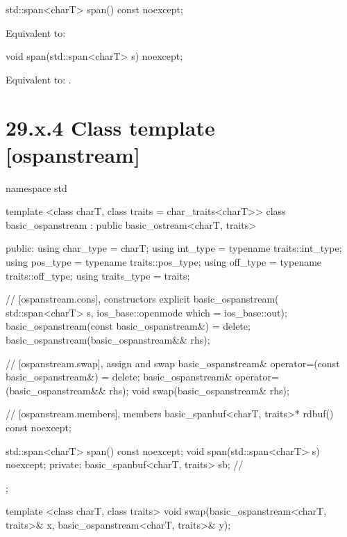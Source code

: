 \documentclass[ebook,11pt,article]{memoir}
\renewcommand{\iref}[1]{[#1]}
\begin{document}
\begin{itemdecl}
std::span<charT> span() const noexcept;
\end{itemdecl}

\begin{itemdescr}
\pnum
\effects Equivalent to:\\
\end{itemdescr}

\begin{itemdecl}
void span(std::span<charT> s) noexcept;
\end{itemdecl}

\begin{itemdescr}
\pnum
\effects
Equivalent to:
.
\end{itemdescr}

\section{29.x.4 Class template  [ospanstream] }

\begin{codeblock}
namespace std {
  template <class charT, class traits = char_traits<charT>>
  class basic_ospanstream
    : public basic_ostream<charT, traits> {
  public:
    using char_type      = charT;
    using int_type       = typename traits::int_type;
    using pos_type       = typename traits::pos_type;
    using off_type       = typename traits::off_type;
    using traits_type    = traits;

    // \iref{ospanstream.cons}, constructors
    explicit basic_ospanstream(
      std::span<charT> s,
      ios_base::openmode which = ios_base::out);
    basic_ospanstream(const basic_ospanstream&) = delete;
    basic_ospanstream(basic_ospanstream&& rhs);

    // \iref{ospanstream.swap}, assign and swap
    basic_ospanstream& operator=(const basic_ospanstream&) = delete;
    basic_ospanstream& operator=(basic_ospanstream&& rhs);
    void swap(basic_ospanstream& rhs);

    // \iref{ospanstream.members}, members
    basic_spanbuf<charT, traits>* rdbuf() const noexcept;

    std::span<charT> span() const noexcept;
    void span(std::span<charT> s) noexcept;
  private:
    basic_spanbuf<charT, traits> sb; // \expos
  };

  template <class charT, class traits>
    void swap(basic_ospanstream<charT, traits>& x,
              basic_ospanstream<charT, traits>& y);
}
\end{codeblock}
\end{document}
